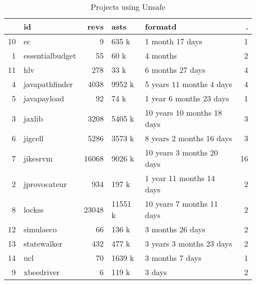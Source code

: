\begin{table}[ht]
\centering
\begin{tabular}{rlrllr}
  \hline
 & id & revs & asts & formatd & . \\ 
  \hline
10 & ec &   9 & 635 k &  1 month 17 days &   1 \\ 
  1 & essentialbudget &  55 & 60 k &  4 months &   2 \\ 
  11 & hlv & 278 & 33 k &  6 months 27 days &   4 \\ 
  4 & javapathfinder & 4038 & 9952 k & 5 years 11 months 4 days &   4 \\ 
  5 & javapayload &  92 & 74 k &  1 year 6 months 23 days &   1 \\ 
  3 & jaxlib & 3208 & 5405 k & 10 years 10 months 18 days &   3 \\ 
  6 & jigcell & 5286 & 3573 k & 8 years 2 months 16 days &   3 \\ 
  7 & jikesrvm & 16068 & 9026 k & 10 years 3 months 20 days &  16 \\ 
  2 & jprovocateur & 934 & 197 k &  1 year 11 months 14 days &   2 \\ 
  8 & lockss & 23048 & 11551 k & 10 years 7 months 11 days &   2 \\ 
  12 & simulaeco &  66 & 136 k &  3 months 26 days &   2 \\ 
  13 & statewalker & 432 & 477 k & 3 years 3 months 23 days &   2 \\ 
  14 & ucl &  70 & 1639 k &  3 months 7 days &   1 \\ 
  9 & xbeedriver &   6 & 119 k &  3 days &   2 \\ 
   \hline
\end{tabular}
\caption{Projects using Unsafe} 
\label{table:projects}
\end{table}
